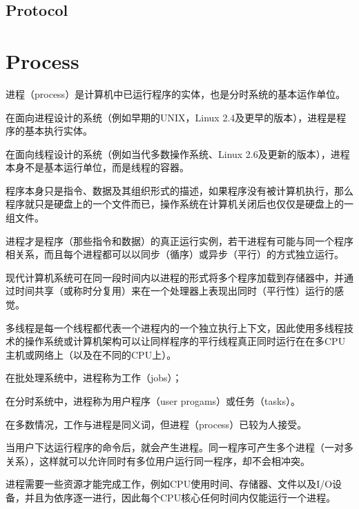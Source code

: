 \subsection{Protocol}







\section{Process}


进程（process）是计算机中已运行程序的实体，也是分时系统的基本运作单位。

\begin{compactitem}
\item 在面向进程设计的系统（例如早期的UNIX，Linux 2.4及更早的版本），进程是程序的基本执行实体。
\item 在面向线程设计的系统（例如当代多数操作系统、Linux 2.6及更新的版本），进程本身不是基本运行单位，而是线程的容器。
\end{compactitem}

程序本身只是指令、数据及其组织形式的描述，如果程序没有被计算机执行，那么程序就只是硬盘上的一个文件而已，操作系统在计算机关闭后也仅仅是硬盘上的一组文件。

进程才是程序（那些指令和数据）的真正运行实例，若干进程有可能与同一个程序相关系，而且每个进程都可以以同步（循序）或异步（平行）的方式独立运行。

现代计算机系统可在同一段时间内以进程的形式将多个程序加载到存储器中，并通过时间共享（或称时分复用）来在一个处理器上表现出同时（平行性）运行的感觉。

多线程是每一个线程都代表一个进程内的一个独立执行上下文，因此使用多线程技术的操作系统或计算机架构可以让同样程序的平行线程真正同时运行在在多CPU主机或网络上（以及在不同的CPU上）。

\begin{compactitem}
\item 在批处理系统中，进程称为工作（jobs）；
\item 在分时系统中，进程称为用户程序（user progams）或任务（tasks）。
\item 在多数情况，工作与进程是同义词，但进程（process）已较为人接受。
\end{compactitem}

当用户下达运行程序的命令后，就会产生进程。同一程序可产生多个进程（一对多关系），这样就可以允许同时有多位用户运行同一程序，却不会相冲突。

进程需要一些资源才能完成工作，例如CPU使用时间、存储器、文件以及I/O设备，并且为依序逐一进行，因此每个CPU核心任何时间内仅能运行一个进程。

